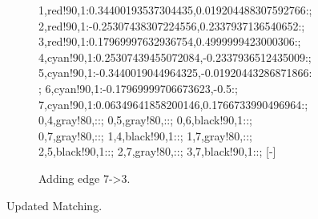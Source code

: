 \begin{figure}
\begin{subfigure}{0.25\textwidth}
{			1,red!90,1:0.34400193537304435\textwidth,0.019204488307592766\textwidth:;
			2,red!90,1:-0.25307438307224556\textwidth,0.2337937136540652\textwidth:;
			3,red!90,1:0.17969997632936754\textwidth,0.4999999423000306\textwidth:;
			4,cyan!90,1:0.25307439455072084\textwidth,-0.2337936512435009\textwidth:;
			5,cyan!90,1:-0.3440019044964325\textwidth,-0.01920443286871866\textwidth:;
			6,cyan!90,1:-0.17969999706673623\textwidth,-0.5\textwidth:;
			7,cyan!90,1:0.06349641858200146\textwidth,0.1766733990496964\textwidth:;
		}{
			0,4,gray!80,::;
			0,5,gray!80,::;
			0,6,black!90,1::;
			0,7,gray!80,::;
			1,4,black!90,1::;
			1,7,gray!80,::;
			2,5,black!90,1::;
			2,7,gray!80,::;
			3,7,black!90,1::;
		}[-]
		\myAdigraph{}
	\caption{Adding edge 7->3.}
    \end{subfigure}
	\caption{Updated Matching.}
\end{figure}